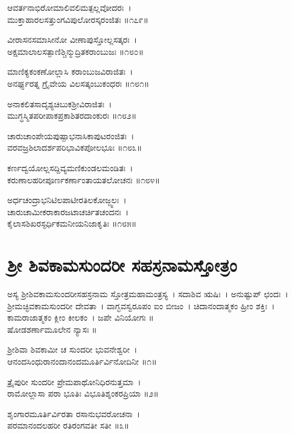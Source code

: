 ಆವರ್ತನಾಭಿರೋಮಾಲಿವಲಿಮತ್ಪಲ್ಲವೋದರಃ~।\\
ಮುಕ್ತಾಹಾರಲಸತ್ತುಂಗವಿಪುಲೋರಸ್ಕರಂಜಿತಃ ॥೧೭೯॥

	ವೀರಾಸನಸಮಾಸೀನೋ ವೀಣಾಪುಸ್ತೋಲ್ಲಸತ್ಕರಃ~।\\
	ಅಕ್ಷಮಾಲಾಲಸತ್ಪಾಣಿಶ್ಚಿನ್ಮುದ್ರಿತಕರಾಂಬುಜಃ ॥೧೮೦॥

ಮಾಣಿಕ್ಯಕಂಕಣೋಲ್ಲಾಸಿ ಕರಾಂಬುಜವಿರಾಜಿತಃ~।\\
ಅನರ್ಘ್ಯರತ್ನ ಗ್ರೈವೇಯ ವಿಲಸತ್ಕಂಬುಕಂಧರಃ ॥೧೮೧॥

	ಅನಾಕಲಿತಸಾದೃಶ್ಯಚಿಬುಕಶ್ರೀವಿರಾಜಿತಃ~।\\
	ಮುಗ್ಧಸ್ಮಿತಪರೀಪಾಕಪ್ರಕಾಶಿತರದಾಂಕುರಃ ॥೧೮೨॥

ಚಾರುಚಾಂಪೇಯಪುಷ್ಪಾಭನಾಸಿಕಾಪುಟರಂಜಿತಃ~।\\
ವರವಜ್ರಶಿಲಾದರ್ಶಪರಿಭಾವಿಕಪೋಲಭೂಃ ॥೧೮೩॥

	ಕರ್ಣದ್ವಯೋಲ್ಲಸದ್ದಿವ್ಯಮಣಿಕುಂಡಲಮಂಡಿತಃ~।\\
	ಕರುಣಾಲಹರೀಪೂರ್ಣಕರ್ಣಾಂತಾಯತಲೋಚನಃ ॥೧೮೪॥

ಅರ್ಧಚಂದ್ರಾಭನಿಟಿಲಪಾಟೀರತಿಲಕೋಜ್ಜ್ವಲಃ~।\\
ಚಾರುಚಾಮೀಕರಾಕಾರಜಟಾಚರ್ಚಿತಚಂದನಃ~।\\
ಕೈಲಾಸಶಿಖರಸ್ಫರ್ಧಿಕಮನೀಯನಿಜಾಕೃತಿಃ ॥೧೮೫॥
\section{ ಶ್ರೀ ಶಿವಕಾಮಸುಂದರೀ ಸಹಸ್ರನಾಮಸ್ತೋತ್ರಂ }
ಅಸ್ಯ ಶ್ರೀಶಿವಕಾಮಸುಂದರೀಸಹಸ್ರನಾಮ ಸ್ತೋತ್ರಮಹಾಮಂತ್ರಸ್ಯ~।
ಸದಾಶಿವ ಋಷಿಃ~। ಅನುಷ್ಟುಪ್ ಛಂದಃ~। ಶ್ರೀಮಚ್ಛಿವಕಾಮಸುಂದರೀ ದೇವತಾ~। ವಾಗ್ಭವಸ್ವರೂಪಂ ಐಂ ಬೀಜಂ~। ಚಿದಾನಂದಾತ್ಮಕಂ ಹ್ರೀಂ ಶಕ್ತಿಃ~। ಕಾಮರಾಜಾತ್ಮಕಂ ಕ್ಲೀಂ ಕೀಲಕಂ~। ಜಪೇ ವಿನಿಯೋಗಃ ॥\\
ಷೋಡಶರ್ಣಾಮೂಲೇನ ನ್ಯಾಸಃ ॥


	ಶ್ರೀಶಿವಾ ಶಿವಕಾಮೀ ಚ ಸುಂದರೀ ಭುವನೇಶ್ವರೀ~।\\
	ಆನಂದಸಿಂಧುರಾನಂದಾನಂದಮೂರ್ತಿರ್ವಿನೋದಿನೀ ॥೧॥

ತ್ರೈಪುರೀ ಸುಂದರೀ ಪ್ರೇಮಪಾಥೋನಿಧಿರನುತ್ತಮಾ~।\\
ರಾಮೋಲ್ಲಾಸಾ ಪರಾ ಭೂತಿಃ ವಿಭೂತಿಶ್ಶಂಕರಪ್ರಿಯಾ ॥೨॥

	ಶೃಂಗಾರಮೂರ್ತಿರ್ವಿರತಾ ರಸಾನುಭವರೋಚನಾ~।\\
	ಪರಮಾನಂದಲಹರೀ ರತಿರಂಗವತೀ ಸತೀ ॥೩॥

